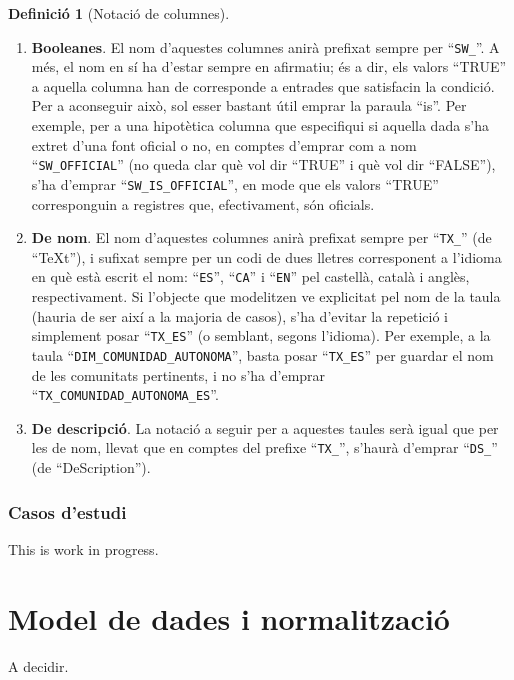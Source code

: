 \documentclass{article}
\theoremstyle{definition}
\newtheorem{definition}{Definició}
\begin{document}
\begin{definition}[Notació de columnes]
\begin{enumerate}
  \item \textbf{Booleanes}. El nom d'aquestes columnes anirà prefixat sempre per ``\verb|SW_|''. A més, el nom en sí ha d'estar sempre en afirmatiu; és a dir, els valors ``TRUE'' a aquella columna han de corresponde a entrades que satisfacin la condició. Per a aconseguir això, sol esser bastant útil emprar la paraula ``is''. Per exemple, per a una hipotètica columna que especifiqui si aquella dada s'ha extret d'una font oficial o no, en comptes d'emprar com a nom ``\verb|SW_OFFICIAL|'' (no queda clar què vol dir ``TRUE'' i què vol dir ``FALSE''), s'ha d'emprar ``\verb|SW_IS_OFFICIAL|'', en mode que els valors ``TRUE'' corresponguin a registres que, efectivament, són oficials.

  \item \textbf{De nom}. El nom d'aquestes columnes anirà prefixat sempre per ``\verb|TX_|'' (de ``TeXt''), i sufixat sempre per un codi de dues lletres corresponent a l'idioma en què està escrit el nom: ``\verb|ES|'', ``\verb|CA|'' i ``\verb|EN|'' pel castellà, català i anglès, respectivament. Si l'objecte que modelitzen ve explicitat pel nom de la taula (hauria de ser així a la majoria de casos), s'ha d'evitar la repetició i simplement posar ``\verb|TX_ES|'' (o semblant, segons l'idioma). Per exemple, a la taula ``\verb|DIM_COMUNIDAD_AUTONOMA|'', basta posar ``\verb|TX_ES|'' per guardar el nom de les comunitats pertinents, i no s'ha d'emprar ``\verb|TX_COMUNIDAD_AUTONOMA_ES|''.

  \item \textbf{De descripció}. La notació a seguir per a aquestes taules serà igual que per les de nom, llevat que en comptes del prefixe ``\verb|TX_|'', s'haurà d'emprar ``\verb|DS_|'' (de ``DeScription'').
\end{enumerate}
\end{definition}

\subsubsection{Casos d'estudi}\label{section:nomenclature:columns:examples}
This is work in progress.

\section{Model de dades i normalització}\label{section:normalization}
A decidir.

%
\end{document}
